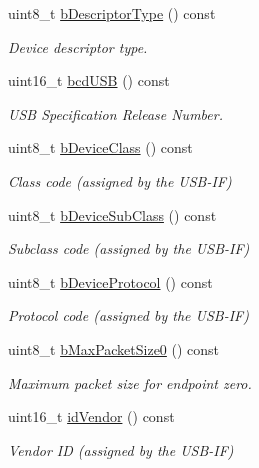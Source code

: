 \begin{DoxyCompactItemize}
uint8\-\_\-t \hyperlink{classmdt_usb_device_descriptor_a1e303645a88a463b24f3804871b9f103}{b\-Descriptor\-Type} () const 
\begin{DoxyCompactList}\small\item\em Device descriptor type. \end{DoxyCompactList}\item 
uint16\-\_\-t \hyperlink{classmdt_usb_device_descriptor_a71385ff84ffb88a1f3c08b324b38a61c}{bcd\-U\-S\-B} () const 
\begin{DoxyCompactList}\small\item\em U\-S\-B Specification Release Number. \end{DoxyCompactList}\item 
uint8\-\_\-t \hyperlink{classmdt_usb_device_descriptor_affd599ad84dc64e76a49473b24ebb94c}{b\-Device\-Class} () const 
\begin{DoxyCompactList}\small\item\em Class code (assigned by the U\-S\-B-\/\-I\-F) \end{DoxyCompactList}\item 
uint8\-\_\-t \hyperlink{classmdt_usb_device_descriptor_add8a18271d679422cd49c8489242cc66}{b\-Device\-Sub\-Class} () const 
\begin{DoxyCompactList}\small\item\em Subclass code (assigned by the U\-S\-B-\/\-I\-F) \end{DoxyCompactList}\item 
uint8\-\_\-t \hyperlink{classmdt_usb_device_descriptor_aa205d2e782c2d559da0b12a2f4ba3aaa}{b\-Device\-Protocol} () const 
\begin{DoxyCompactList}\small\item\em Protocol code (assigned by the U\-S\-B-\/\-I\-F) \end{DoxyCompactList}\item 
uint8\-\_\-t \hyperlink{classmdt_usb_device_descriptor_a7f17126a202ab728e642ba1c4d65e004}{b\-Max\-Packet\-Size0} () const 
\begin{DoxyCompactList}\small\item\em Maximum packet size for endpoint zero. \end{DoxyCompactList}\item 
uint16\-\_\-t \hyperlink{classmdt_usb_device_descriptor_a877e648e96b9dabd54220a14f4ad0cc7}{id\-Vendor} () const 
\begin{DoxyCompactList}\small\item\em Vendor I\-D (assigned by the U\-S\-B-\/\-I\-F) \end{DoxyCompactList}\item 

\end{DoxyCompactItemize}
